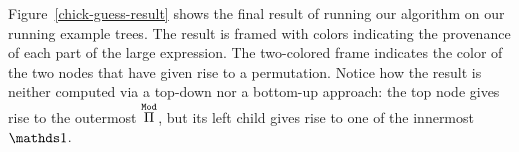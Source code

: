 

Figure~\ref{chick-guess-result} shows the final result of running our algorithm
on our running example trees.  The result is framed with colors indicating the
provenance of each part of the large expression.  The two-colored frame
indicates the color of the two nodes that have given rise to a permutation.
Notice how the result is neither computed via a top-down nor a bottom-up
approach: the top node gives rise to the outermost $\overset{\mathtt{Mod}}{\Pi}{}$, but its
left child gives rise to one of the innermost $\MathSame{}$.


